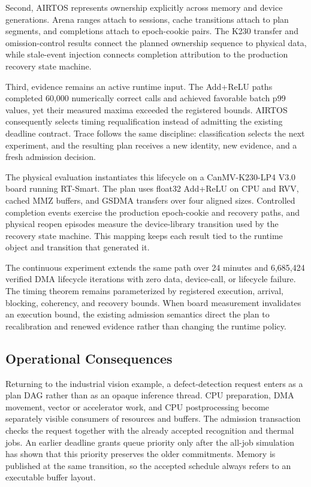 \documentclass[lettersize,journal]{IEEEtran}
\begin{document}
Second, AIRTOS represents ownership explicitly across memory and device
generations. Arena ranges attach to sessions, cache transitions attach to plan
segments, and completions attach to epoch-cookie pairs. The K230 transfer and
omission-control results connect the planned ownership sequence to physical
data, while stale-event injection connects completion attribution to the
production recovery state machine.

Third, evidence remains an active runtime input. The Add+ReLU paths completed
60,000 numerically correct calls and achieved favorable batch p99 values, yet
their measured maxima exceeded the registered bounds. AIRTOS consequently
selects timing requalification instead of admitting the existing deadline
contract. Trace follows the same discipline: classification selects the next
experiment, and the resulting plan receives a new identity, new evidence, and
a fresh admission decision.

The physical evaluation instantiates this lifecycle on a CanMV-K230-LP4 V3.0
board running RT-Smart. The plan uses float32 Add+ReLU on CPU and RVV, cached
MMZ buffers, and GSDMA transfers over four aligned sizes. Controlled
completion events exercise the production epoch-cookie and recovery paths,
and physical reopen episodes measure the device-library transition used by
the recovery state machine. This mapping keeps each result tied to the runtime
object and transition that generated it.

The continuous experiment extends the same path over 24 minutes and 6,685,424
verified DMA lifecycle iterations with zero data, device-call, or lifecycle
failure. The timing theorem remains parameterized by registered execution,
arrival, blocking, coherency, and recovery bounds. When board measurement
invalidates an execution bound, the existing admission semantics direct the
plan to recalibration and renewed evidence rather than changing the runtime
policy.

\subsection{Operational Consequences}
Returning to the industrial vision example, a defect-detection request enters
as a plan DAG rather than as an opaque inference thread. CPU preparation, DMA
movement, vector or accelerator work, and CPU postprocessing become separately
visible consumers of resources and buffers. The admission transaction checks
the request together with the already accepted recognition and thermal jobs.
An earlier deadline grants queue priority only after the all-job simulation has
shown that this priority preserves the older commitments. Memory is published
at the same transition, so the accepted schedule always refers to an executable
buffer layout.
\end{document}
